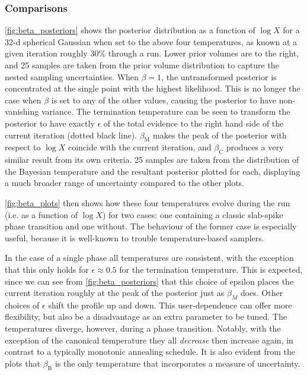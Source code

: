 \documentclass[usenatbib]{mnras}
\begin{document}
\subsubsection*{Comparisons}
\cref{fig:beta_posteriors} shows the posterior distribution as a function of $\log X$ for a 32-d spherical Gaussian when set to the above four temperatures, as known at a given iteration roughly 30\% through a run. Lower prior volumes are to the right, and 25 samples are taken from the prior volume distribution to capture the nested sampling uncertainties. When $\beta = 1$, the untransformed posterior is concentrated at the single point with the highest likelihood. This is no longer the case when $\beta$ is set to any of the other values, causing the posterior to have non-vanishing variance. The termination temperature can be seen to transform the posterior to have exactly $\epsilon$ of the total evidence to the right hand side of the current iteration (dotted black line). $\beta_\mathrm{M}$ makes the peak of the posterior with respect to $\log X$ coincide with the current iteration, and $\beta_\mathrm{C}$ produces a very similar result from its own criteria. 25 samples are taken from the distribution of the Bayesian temperature and the resultant posterior plotted for each, displaying a much broader range of uncertainty compared to the other plots.
\par
\cref{fig:beta_plots} then shows how these four temperatures evolve during the run (i.e. as a function of $\log X$) for two cases: one containing a classic slab-spike phase transition and one without. The behaviour of the former case is especially useful, because it is well-known to trouble temperature-based samplers. 
\par
In the case of a single phase all temperatures are consistent, with the exception that this only holds for $\epsilon \approx 0.5$ for the termination temperature. This is expected, since we can see from \cref{fig:beta_posteriors} that this choice of epsilon places the current iteration roughly at the peak of the posterior just as $\beta_M$ does. Other choices of $\epsilon$ shift the profile up and down. This user-dependence can offer more flexibility, but also be a disadvantage as an extra parameter to be tuned. The temperatures diverge, however, during a phase transition. Notably, with the exception of the canonical temperature they all \textit{decrease} then increase again, in contrast to a typically monotonic annealing schedule. It is also evident from the plots that $\beta_\mathrm{B}$ is the only temperature that incorporates a measure of uncertainty.
\end{document}
